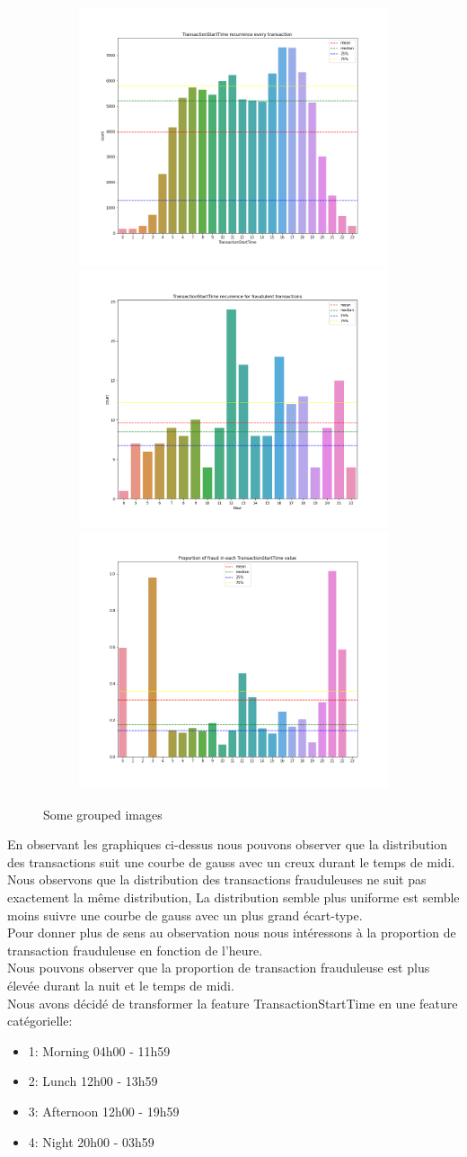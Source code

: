 \documentclass{article}
\begin{document}
\begin{figure}
  \begin{subfigure}{\linewidth}
  \includegraphics[width=.3\linewidth]{./images/TransactionStartTime_recurrence_every_transaction.png}\hfill
  \includegraphics[width=.3\linewidth]{./images/TransactionStartTime_recurrence_fraud.png}\hfill
  \includegraphics[width=.3\linewidth]{./images/TransactionStartTime_proportion_fraud.png}
  \end{subfigure}\par\medskip
  
  \caption{Some grouped images}
\end{figure}


En observant les graphiques ci-dessus nous pouvons observer que la distribution des transactions suit une courbe de gauss avec un creux durant le temps de midi. Nous observons que la distribution des transactions frauduleuses ne suit pas  exactement la même distribution, 
La distribution semble plus uniforme est semble moins suivre une courbe de gauss avec un plus grand écart-type.\\
Pour donner plus de sens au observation nous nous intéressons à la proportion de transaction frauduleuse en fonction de l'heure.\\
Nous pouvons observer que la proportion de transaction frauduleuse est plus élevée durant la nuit et le temps de midi.\\
Nous avons décidé de transformer la feature TransactionStartTime en une feature catégorielle:\\
\begin{itemize}
    \item 1: Morning 04h00 - 11h59
    \item 2: Lunch 12h00 - 13h59
    \item 3: Afternoon 12h00 - 19h59
    \item 4: Night 20h00 - 03h59
\end{itemize}
\end{document}
